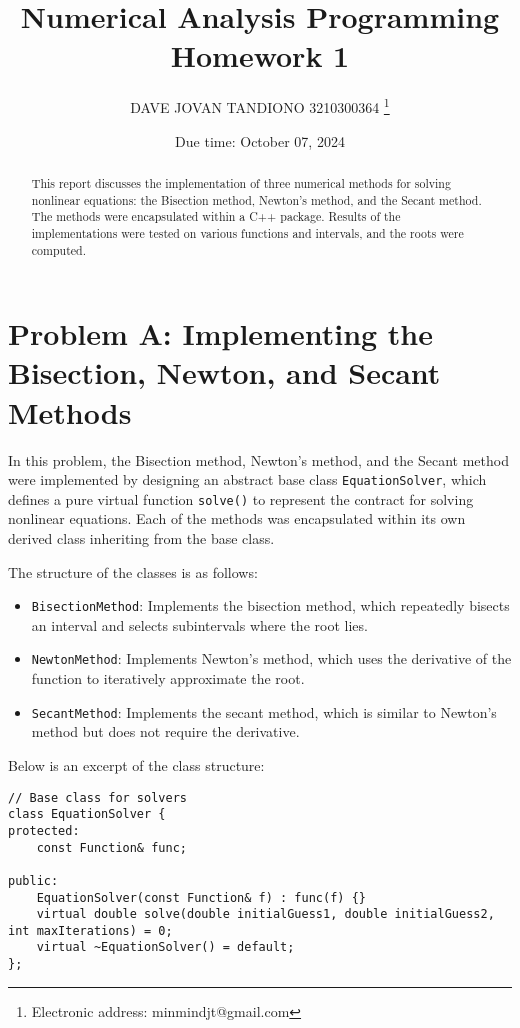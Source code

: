 \documentclass[a4paper]{article}
\begin{document}
\title{Numerical Analysis Programming Homework 1}

\author{DAVE JOVAN TANDIONO 3210300364
    \thanks{Electronic address: minmindjt@gmail.com}}

\date{Due time: October 07, 2024}

\maketitle

\begin{abstract}
    This report discusses the implementation of three numerical methods for solving nonlinear equations: the Bisection method, Newton's method, and the Secant method. The methods were encapsulated within a C++ package. Results of the implementations were tested on various functions and intervals, and the roots were computed. 
\end{abstract}

\section*{Problem A: Implementing the Bisection, Newton, and Secant Methods}

In this problem, the Bisection method, Newton's method, and the Secant method were implemented by designing an abstract base class \texttt{EquationSolver}, which defines a pure virtual function \texttt{solve()} to represent the contract for solving nonlinear equations. Each of the methods was encapsulated within its own derived class inheriting from the base class.

The structure of the classes is as follows:
\begin{itemize}
    \item \texttt{BisectionMethod}: Implements the bisection method, which repeatedly bisects an interval and selects subintervals where the root lies.
    \item \texttt{NewtonMethod}: Implements Newton's method, which uses the derivative of the function to iteratively approximate the root.
    \item \texttt{SecantMethod}: Implements the secant method, which is similar to Newton's method but does not require the derivative.
\end{itemize}

Below is an excerpt of the class structure:
\begin{lstlisting}
// Base class for solvers
class EquationSolver {
protected:
    const Function& func;

public:
    EquationSolver(const Function& f) : func(f) {}
    virtual double solve(double initialGuess1, double initialGuess2, int maxIterations) = 0;
    virtual ~EquationSolver() = default;
};
\end{lstlisting}
\end{document}
